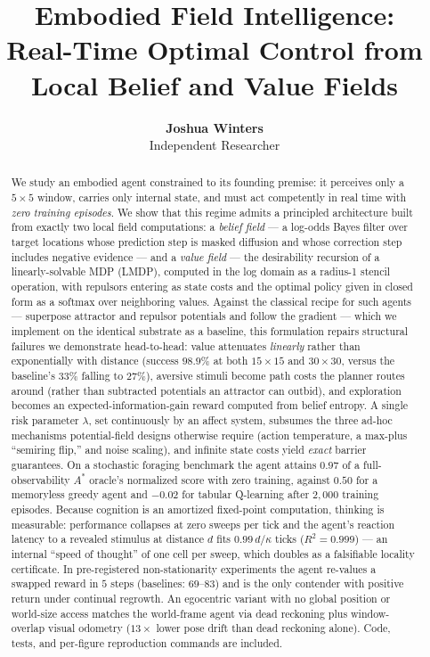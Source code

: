 \documentclass[11pt]{article}
\title{Embodied Field Intelligence:\\
Real-Time Optimal Control from Local Belief and Value Fields}
\author{\textbf{Joshua Winters}\\
{\small Independent Researcher}}
\date{}
\begin{document}
\maketitle

\begin{abstract}
We study an embodied agent constrained to its founding premise: it perceives only a $5{\times}5$ window, carries only internal state, and must act competently in real time with \emph{zero training episodes}. We show that this regime admits a principled architecture built from exactly two local field computations: a \emph{belief field} --- a log-odds Bayes filter over target locations whose prediction step is masked diffusion and whose correction step includes negative evidence --- and a \emph{value field} --- the desirability recursion of a linearly-solvable MDP (LMDP), computed in the log domain as a radius-1 stencil operation, with repulsors entering as state costs and the optimal policy given in closed form as a softmax over neighboring values. Against the classical recipe for such agents --- superpose attractor and repulsor potentials and follow the gradient --- which we implement on the identical substrate as a baseline, this formulation repairs structural failures we demonstrate head-to-head: value attenuates \emph{linearly} rather than exponentially with distance (success $98.9\%$ at both $15{\times}15$ and $30{\times}30$, versus the baseline's $33\%$ falling to $27\%$), aversive stimuli become path costs the planner routes around (rather than subtracted potentials an attractor can outbid), and exploration becomes an expected-information-gain reward computed from belief entropy. A single risk parameter $\lambda$, set continuously by an affect system, subsumes the three ad-hoc mechanisms potential-field designs otherwise require (action temperature, a max-plus ``semiring flip,'' and noise scaling), and infinite state costs yield \emph{exact} barrier guarantees. On a stochastic foraging benchmark the agent attains $0.97$ of a full-observability $A^\ast$ oracle's normalized score with zero training, against $0.50$ for a memoryless greedy agent and $-0.02$ for tabular Q-learning after $2{,}000$ training episodes. Because cognition is an amortized fixed-point computation, thinking is measurable: performance collapses at zero sweeps per tick and the agent's reaction latency to a revealed stimulus at distance $d$ fits $0.99\,d/\kappa$ ticks ($R^2=0.999$) --- an internal ``speed of thought'' of one cell per sweep, which doubles as a falsifiable locality certificate. In pre-registered non-stationarity experiments the agent re-values a swapped reward in $5$ steps (baselines: $69$--$83$) and is the only contender with positive return under continual regrowth. An egocentric variant with no global position or world-size access matches the world-frame agent via dead reckoning plus window-overlap visual odometry ($13\times$ lower pose drift than dead reckoning alone). Code, tests, and per-figure reproduction commands are included.
\end{abstract}
\end{document}
